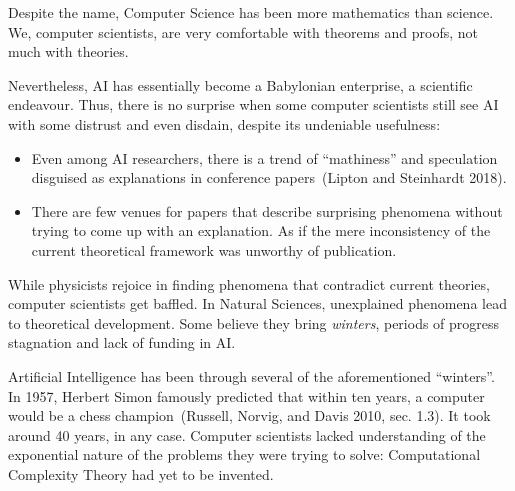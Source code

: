 \documentclass[
  a4paperpaper,
  a4paper,
  12pt,
  twoside,
  brazil,
  british,
  open=right]{scrbook}
\begin{document}
Despite the name, Computer Science has been more mathematics than
science. We, computer scientists, are very comfortable with theorems and
proofs, not much with theories.

Nevertheless, {AI} has essentially become a Babylonian enterprise, a
scientific endeavour. Thus, there is no surprise when some computer
scientists still see AI with some distrust and even disdain, despite its
undeniable usefulness:

\begin{itemize}
\item
  Even among AI researchers, there is a trend of ``mathiness'' and
  speculation disguised as explanations in conference papers~(Lipton and
  Steinhardt
  2018).
\item
  There are few venues for papers that describe surprising phenomena
  without trying to come up with an explanation. As if the mere
  inconsistency of the current theoretical framework was unworthy of
  publication.
\end{itemize}

While physicists rejoice in finding phenomena that contradict current
theories, computer scientists get baffled. In Natural Sciences,
unexplained phenomena lead to theoretical development. Some believe they
bring \emph{winters}, periods of progress stagnation and lack of funding
in {AI}.

Artificial Intelligence has been through several of the aforementioned
``winters''. In 1957, Herbert Simon famously predicted that within
ten years, a computer would be a chess champion~(Russell, Norvig, and
Davis 2010, sec.
1.3).
It took around 40 years, in any case. Computer scientists lacked
understanding of the exponential nature of the problems they were trying
to solve: Computational Complexity Theory had yet to be invented.
\end{document}
